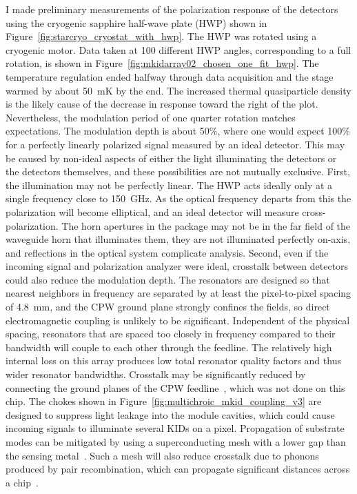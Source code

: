 I made preliminary measurements of the polarization response of the detectors using the cryogenic sapphire half-wave plate (HWP) shown in Figure~\ref{fig:starcryo_cryostat_with_hwp}.
The HWP was rotated using a cryogenic motor.
Data taken at 100 different HWP angles, corresponding to a full rotation, is shown in Figure~\ref{fig:mkidarray02_chosen_one_fit_hwp}.
The temperature regulation ended halfway through data acquisition and the stage warmed by about \SI{50}{mK} by the end.
The increased thermal quasiparticle density is the likely cause of the decrease in response toward the right of the plot.
Nevertheless, the modulation period of one quarter rotation matches expectations.
The modulation depth is about 50\%, where one would expect 100\% for a perfectly linearly polarized signal measured by an ideal detector.
This may be caused by non-ideal aspects of either the light illuminating the detectors or the detectors themselves, and these possibilities are not mutually exclusive.
First, the illumination may not be perfectly linear.
The HWP acts ideally only at a single frequency close to \SI{150}{GHz}.
As the optical frequency departs from this the polarization will become elliptical, and an ideal detector will measure cross-polarization.
The horn apertures in the package may not be in the far field of the waveguide horn that illuminates them, they are not illuminated perfectly on-axis, and reflections in the optical system complicate analysis.
Second, even if the incoming signal and polarization analyzer were ideal, crosstalk between detectors could also reduce the modulation depth.
The resonators are designed so that nearest neighbors in frequency are separated by at least the pixel-to-pixel spacing of \SI{4.8}{mm}, and the CPW ground plane strongly confines the fields, so direct electromagnetic coupling is unlikely to be significant.
Independent of the physical spacing, resonators that are spaced too closely in frequency compared to their bandwidth will couple to each other through the feedline.
The relatively high internal loss on this array produces low total resonator quality factors and thus wider resonator bandwidths.
Crosstalk may be significantly reduced by connecting the ground planes of the CPW feedline~\autocite{Yates2014JLTP}, which was not done on this chip.
The chokes shown in Figure~\ref{fig:multichroic_mkid_coupling_v3} are designed to suppress light leakage into the module cavities, which could cause incoming signals to illuminate several KIDs on a pixel.
Propagation of substrate modes can be mitigated by using a superconducting mesh with a lower gap than the sensing metal~\autocite{McCarrick2016JLTP, Baselmans2017AA}.
Such a mesh will also reduce crosstalk due to phonons produced by pair recombination, which can propagate significant distances across a chip~\autocite{Patel2017PRB}.


